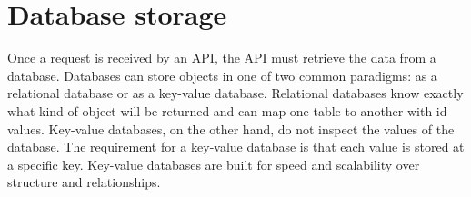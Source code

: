 \documentclass[stat,dissertation]{puthesis}\usepackage[]{graphicx}\usepackage{xcolor}
\begin{document}
%
%
%
%

\section{Database storage}

Once a request is received by an API, the API must retrieve the data from a database.  Databases can store objects in one of two common paradigms: as a relational database or as a key-value database.  Relational databases know exactly what kind of object will be returned and can map one table to another with id values.  Key-value databases, on the other hand, do not inspect the values of the database.  The requirement for a key-value database is that each value is stored at a specific key.  Key-value databases are built for speed and scalability over structure and relationships.
\end{document}
